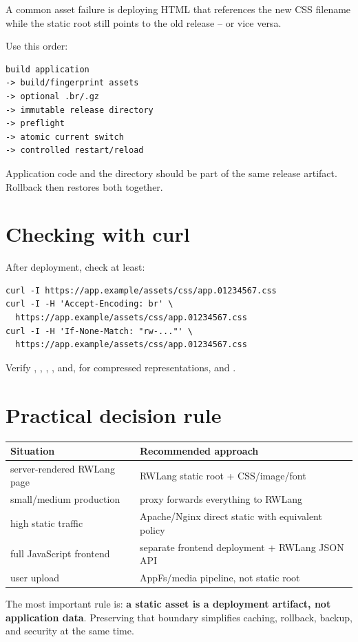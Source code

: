 A common asset failure is deploying HTML that references the new CSS filename while the static root still points to the old release -- or vice versa.

Use this order:

\begin{lstlisting}
build application
-> build/fingerprint assets
-> optional .br/.gz
-> immutable release directory
-> preflight
-> atomic current switch
-> controlled restart/reload
\end{lstlisting}

Application code and the  directory should be part of the same release artifact. Rollback then restores both together.

\section{Checking with curl}

After deployment, check at least:

\begin{lstlisting}
curl -I https://app.example/assets/css/app.01234567.css
curl -I -H 'Accept-Encoding: br' \
  https://app.example/assets/css/app.01234567.css
curl -I -H 'If-None-Match: "rw-..."' \
  https://app.example/assets/css/app.01234567.css
\end{lstlisting}

Verify , , , , and, for compressed representations,  and .

\section{Practical decision rule}

\begin{center}
\begin{tabularx}{\textwidth}{@{}lY@{}}
\toprule
Situation & Recommended approach \\
\midrule
server-rendered RWLang page & RWLang static root + CSS/image/font \\
small/medium production & proxy forwards everything to RWLang \\
high static traffic & Apache/Nginx direct static with equivalent policy \\
full JavaScript frontend & separate frontend deployment + RWLang JSON API \\
user upload & AppFs/media pipeline, not static root \\
\bottomrule
\end{tabularx}
\end{center}

The most important rule is: \textbf{a static asset is a deployment artifact, not application data}. Preserving that boundary simplifies caching, rollback, backup, and security at the same time.
